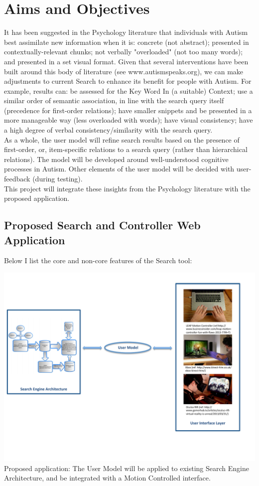 \documentclass[a4paper, 11pt]{article}
\begin{document}
\section{Aims and Objectives} 
It has been suggested in the Psychology literature that individuals with Autism best assimilate new information when it is: concrete (not abstract); presented in contextually-relevant chunks; not verbally "overloaded" (not too many words); and presented in a set visual format. Given that several interventions have been built around this body of literature (see www.autismspeaks.org), we can make adjustments to current Search to enhance its benefit for people with Autism. For example, results can: be assessed for the Key Word In (a suitable) Context; use a similar order of semantic association, in line with the search query itself (precedence for first-order relations); have smaller snippets and be presented in a more manageable way (less overloaded with words); have visual consistency; have a high degree of verbal consistency/similarity with the search query.
\\As a whole, the user model will refine search results based on the presence of first-order, or, item-specific relations to a search query (rather than hierarchical relations). The model will be developed around well-understood cognitive processes in Autism. Other elements of the user model will be decided with user-feedback (during testing). 
\\This project will integrate these insights from the Psychology literature with the proposed application.

\subsection{Proposed Search and Controller Web Application}\label{proposed}
Below I list the core and non-core features of the Search tool:

\begin{center}
\includegraphics[scale=0.7]{searchEngArchi}
Proposed application: The User Model will be applied to existing Search Engine Architecture\cite{seimage}, and be integrated with a Motion Controlled interface.
\end{center}
\end{document}
